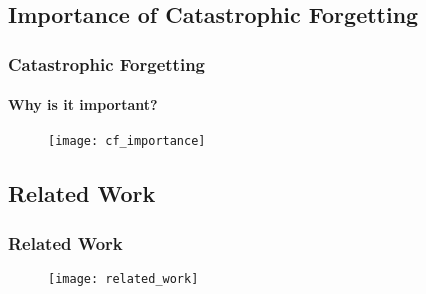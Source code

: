         \subsection{Importance of Catastrophic Forgetting}
        \begin{frame}
            \frametitle{Catastrophic Forgetting}
            \framesubtitle{Why is it important?}

            \begin{figure}[H]
                \centering
                \texttt{[image: cf\_importance]}
                \label{fig:cf_importance}
            \end{figure}
        \end{frame}

        \subsection{Related Work}
        \begin{frame}
            \frametitle{Related Work}
            
            \begin{figure}[H]
                \centering
                \texttt{[image: related\_work]}
                \label{fig:related_work}
            \end{figure}
        \end{frame}